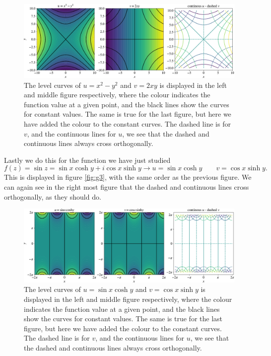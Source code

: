 \documentclass[12pt,twoside]{article}
\begin{document}
\begin{figure}
  \centering
  \includegraphics[width=\textwidth]{../figures/secound.pdf}
  \caption{The level curves of $u=x^2-y^2$ and $v=2xy$ is displayed in the left and middle figure respectively, where the colour indicates the function value at a given point, and the black lines show the curves for constant values. The same is true for the last figure, but here we have added the colour to the constant curves. The dashed line is for $v$, and the continuous lines for $u$, we see that the dashed and continuous lines always cross orthogonally.}
  \label{fig:g2}
\end{figure}
Lastly we do this for the function we have just studied
\begin{equation}
  f(z) = \sin{z} = \sin{x}\cosh{y}+i\cos{x}\sinh{y} \rightarrow u=\sin{x}\cosh{y}\qquad v=\cos{x}\sinh{y}.
\end{equation}
This is displayed in figure \vref{fig:g3}, with the same order as the previous figure. We can again see in the right most figure that the dashed and continuous lines cross orthogonally, as they should do.\par
\begin{figure}
  \centering
  \includegraphics[width=\textwidth]{../figures/third.pdf}
  \caption{The level curves of $u=\sin{x}\cosh{y}$ and $v=\cos{x}\sinh{y}$ is displayed in the left and middle figure respectively, where the colour indicates the function value at a given point, and the black lines show the curves for constant values. The same is true for the last figure, but here we have added the colour to the constant curves. The dashed line is for $v$, and the continuous lines for $u$, we see that the dashed and continuous lines always cross orthogonally.}
  \label{fig:g3}
\end{figure}
\end{document}
